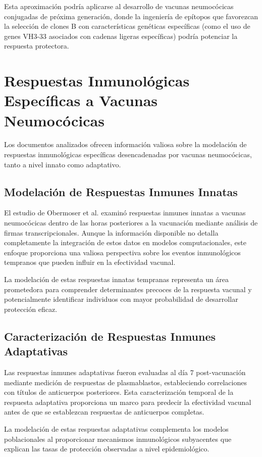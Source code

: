 Esta aproximación podría aplicarse al desarrollo de vacunas neumocócicas conjugadas de próxima generación, donde la ingeniería de epítopos que favorezcan la selección de clones B con características genéticas específicas (como el uso de genes VH3-33 asociados con cadenas ligeras específicas) podría potenciar la respuesta protectora.

\section{Respuestas Inmunológicas Específicas a Vacunas Neumocócicas}

Los documentos analizados ofrecen información valiosa sobre la modelación de respuestas inmunológicas específicas desencadenadas por vacunas neumocócicas, tanto a nivel innato como adaptativo.

\subsection{Modelación de Respuestas Inmunes Innatas}

El estudio de Obermoser et al. \cite{Obermoser2013} examinó respuestas inmunes innatas a vacunas neumocócicas dentro de las horas posteriores a la vacunación mediante análisis de firmas transcripcionales. Aunque la información disponible no detalla completamente la integración de estos datos en modelos computacionales, este enfoque proporciona una valiosa perspectiva sobre los eventos inmunológicos tempranos que pueden influir en la efectividad vacunal.

La modelación de estas respuestas innatas tempranas representa un área prometedora para comprender determinantes precoces de la respuesta vacunal y potencialmente identificar individuos con mayor probabilidad de desarrollar protección eficaz.

\subsection{Caracterización de Respuestas Inmunes Adaptativas}

Las respuestas inmunes adaptativas fueron evaluadas al día 7 post-vacunación mediante medición de respuestas de plasmablastos, estableciendo correlaciones con títulos de anticuerpos posteriores. Esta caracterización temporal de la respuesta adaptativa proporciona un marco para predecir la efectividad vacunal antes de que se establezcan respuestas de anticuerpos completas.

La modelación de estas respuestas adaptativas complementa los modelos poblacionales al proporcionar mecanismos inmunológicos subyacentes que explican las tasas de protección observadas a nivel epidemiológico.

